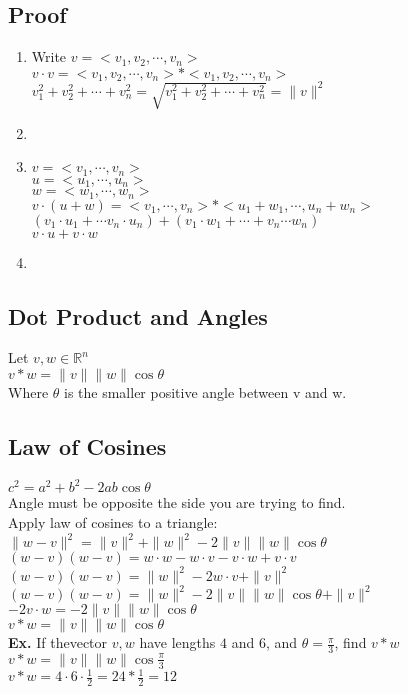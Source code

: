 \documentclass[]{article}
\begin{document}
\subsection{Proof}
\begin{enumerate}
    \item Write $v = <v_1, v_2, \cdots, v_n>$\\
        $v \cdot v = <v_1, v_2, \cdots, v_n> * <v_1, v_2, \cdots, v_n>$\\
        $v_1^2 + v_2^2 + \cdots + v_n^2 = \sqrt{v_1^2 + v_2^2 + \cdots + v_n^2} = \|v\|^2$
    \item 
        \item $v = <v_1, \cdots, v_n>$\\
         $u = <u_1, \cdots, u_n>$\\
         $w = <w_1, \cdots, w_n>$\\
         $v \cdot (u + w) = <v_1, \cdots, v_n> * <u_1 + w_1, \cdots, u_n + w_n>$\\
         $(v_1\cdot u_1 + \cdots v_n\cdot u_n) + (v_1\cdot w_1 + \cdots + v_n\cdots w_n)$\\
         $v \cdot u + v \cdot w$
         \item 
\end{enumerate}

\subsection{Dot Product and Angles}
Let $v, w \in \mathbb{R}^n$\\
$v * w = \|v\|\|w\|\cos\theta$\\
Where $\theta$ is the smaller positive angle between v and w.\\

\subsection{Law of Cosines}
$c^2 = a^2 + b^2 - 2ab\cos\theta$\\
Angle must be opposite the side you are trying to find.\\

Apply law of cosines to a triangle:\\
$\|w-v\|^2 = \|v\|^2 + \|w\|^2-2\|v\|\|w\|\cos\theta$\\
$(w-v)(w-v) = w\cdot w - w\cdot v - v\cdot w + v\cdot v$\\
$(w-v)(w-v) = \|w\|^2 - 2w\cdot v + \|v\|^2$\\
$(w-v)(w-v) = \|w\|^2 - 2\|v\|\|w\|\cos\theta + \|v\|^2$\\
$-2v\cdot w = -2\|v\|\|w\|\cos\theta$\\
$v*w = \|v\|\|w\|\cos\theta$
\\
\textbf{Ex.} If thevector $v, w$ have lengths $4$ and $6$, and $\theta = \frac{\pi}{3}$, find $v*w$\\
$v*w = \|v\|\|w\|\cos\frac{\pi}{3}$\\
$v*w = 4\cdot 6\cdot\frac{1}{2} = 24 * \frac{1}{2} = 12$\\
\end{document}
